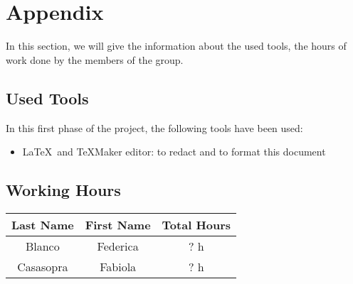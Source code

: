 \section{Appendix} \label{sec:app}
In this section, we will give the information about the used tools, the hours of work done by the members of the group.

\subsection{Used Tools} \label{tools}

In this first phase of the project, the following tools have been used:

\begin{itemize}
	\item \LaTeX\ and TeXMaker editor: to redact and to format this document
\end{itemize}

\subsection{Working Hours} \label{worked}

\begin{table}[htbp]
\begin{center}
\begin{tabular}[t]{ccc}

\hline
\textbf{Last Name} & \textbf{First Name} & \textbf{Total Hours} \\
\hline
Blanco & Federica &  ? h\\
\hline
Casasopra & Fabiola &  ? h\\
\hline

\end{tabular}
\end{center}
\end{table}


